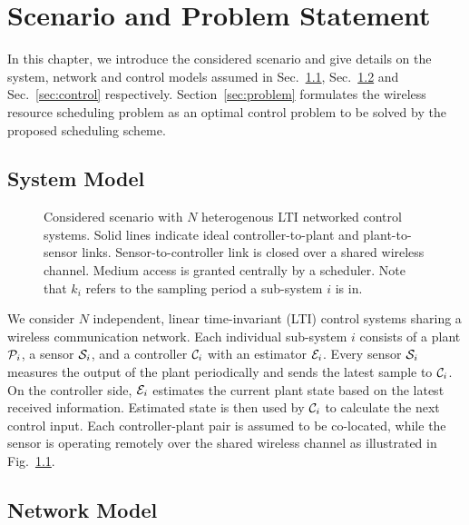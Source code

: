 \chapter{Scenario and Problem Statement}

In this chapter, we introduce the considered scenario and give details on the
system, network and control models assumed in Sec.~\ref{sec:system},
Sec.~\ref{sec:network} and Sec.~\ref{sec:control} respectively.
Section~\ref{sec:problem} formulates the wireless resource scheduling problem as
an optimal control problem to be solved by the proposed scheduling scheme.

\section{System Model} \label{sec:system} 

\begin{figure}[htb]
  \centering
  \resizebox*{.8\textwidth}{!}{} \caption[Scheme of
  $N$ sub-systems sharing a wireless communication medium]{Considered scenario
  with $N$ heterogenous LTI networked control systems. Solid lines indicate
  ideal controller-to-plant and plant-to-sensor links. Sensor-to-controller link
  is closed over a shared wireless channel. Medium access is granted centrally
  by a scheduler. Note that $k_i$ refers to the sampling period a sub-system $i$
  is in.}
  \label{fig:scenario}
\end{figure}

We consider $N$ independent, linear time-invariant (LTI) control systems sharing
a wireless communication network. Each individual sub-system $i$ consists of a
plant $\mathcal{P}_i$, a sensor $\mathcal{S}_i$, and a controller $\mathcal{C}_i$ with an
estimator $\mathcal{E}_i$. Every sensor $\mathcal{S}_i$ measures the output of the plant
periodically and sends the latest sample to $\mathcal{C}_i$. On the controller
side, $\mathcal{E}_i$ estimates the current plant state based on the latest
received information. Estimated state is then used by $\mathcal{C}_i$ to calculate
the next control input. Each controller-plant pair is assumed to be co-located,
while the sensor is operating remotely over the shared wireless channel as
illustrated in Fig.~\ref{fig:scenario}.

\section{Network Model} \label{sec:network} 

